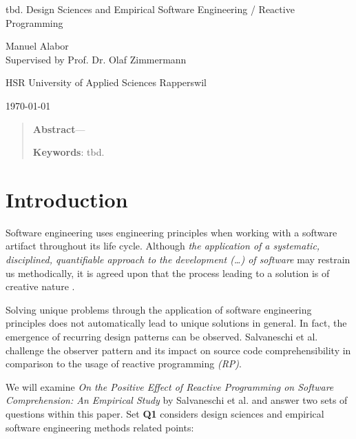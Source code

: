 \documentclass[12pt,a4paper]{article}
\begin{document}
\begin{centering}
	\Huge{tbd. Design Sciences and Empirical Software Engineering / Reactive Programming}
	\par
	\vspace{2ex}

	\normalsize{
		Manuel Alabor\\
		Supervised by Prof. Dr. Olaf Zimmermann\\
		\par
		\vspace{2ex}
		HSR University of Applied Sciences Rapperswil\\
		\par
		\vspace{2ex}
		\today
	}
	\par
	\vspace{2ex}

	\begin{quotation}
		\small{
			\textbf{Abstract}---
		}
		\par
		\vspace{2ex}

		\small{
			\textbf{Keywords}: tbd.
		}
		\par
		\vspace{4ex}
	\end{quotation}
\end{centering}

\section{Introduction}
Software engineering uses engineering principles when working with a software artifact \cite{159342} throughout its life cycle. Although \emph{the application of a systematic, disciplined, quantifiable approach to the development (\dots) of software} \cite{159342} may restrain us methodically, it is agreed upon that the process leading to a solution is of creative nature \cite{8051350}.

Solving unique problems through the application of software engineering principles does not automatically lead to unique solutions in general. In fact, the emergence of recurring design patterns can be observed. Salvaneschi et al. \cite{7827078} challenge the observer pattern \cite{gamma1995design} and its impact on source code comprehensibility in comparison to the usage of reactive programming \emph{(RP)}.

We will examine \emph{On the Positive Effect of Reactive Programming on Software Comprehension: An Empirical Study} by Salvaneschi et al. \cite{7827078} and answer two sets of questions within this paper. Set \textbf{Q1} considers design sciences and empirical software engineering methods related points:
\end{document}
